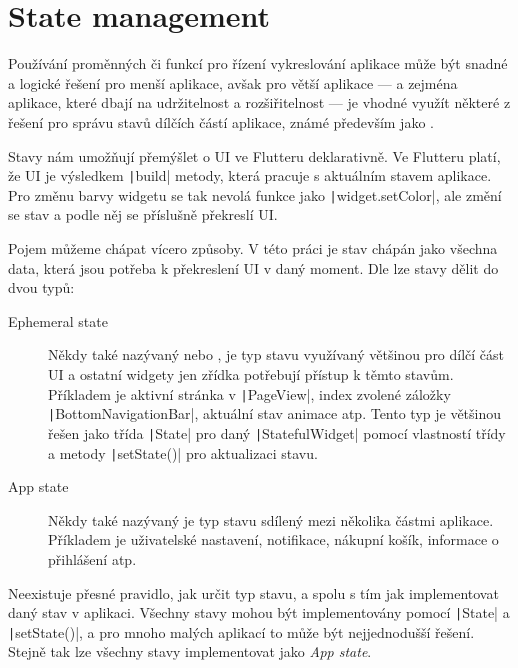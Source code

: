 \section{State management}

Používání proměnných či funkcí pro řízení vykreslování aplikace může být
snadné a logické řešení pro menší aplikace,
avšak pro větší aplikace
--- a zejména aplikace, které dbají na udržitelnost a rozšiřitelnost ---
je vhodné využít některé z řešení pro správu stavů dílčích částí aplikace,
známé především jako .
 
Stavy nám umožňují přemýšlet o UI ve Flutteru deklarativně.
Ve Flutteru platí,
že UI je výsledkem \texttt|build| metody,
která pracuje s aktuálním stavem aplikace.
Pro změnu barvy widgetu se tak nevolá funkce jako
\texttt|widget.setColor|,
ale změní se stav a podle něj se příslušně překreslí UI.
\cite{flutter_state_mgmt_declarative}

Pojem  můžeme chápat vícero způsoby.
V této práci je stav chápán jako všechna data,
která jsou potřeba k překreslení UI v daný moment.
Dle \cite{flutter_state_mgmt_ephemeral_vs_app} lze stavy dělit do dvou typů:

\begin{description}
    \item[Ephemeral state] Někdy také nazývaný  nebo
,
je typ stavu využívaný většinou pro dílčí část UI
a ostatní widgety jen zřídka potřebují přístup k těmto stavům.
Příkladem je aktivní stránka v \texttt|PageView|,
index zvolené záložky \texttt|BottomNavigationBar|,
aktuální stav animace atp.
Tento typ je většinou řešen jako třída \texttt|State| pro daný
\texttt|StatefulWidget| pomocí vlastností třídy a metody
\texttt|setState()| pro aktualizaci stavu.
    \item[App state] Někdy také nazývaný  je typ stavu
sdílený mezi několika částmi aplikace.
Příkladem je uživatelské nastavení, notifikace, nákupní košík,
informace o přihlášení atp.
\end{description}

Neexistuje přesné pravidlo,
jak určit typ stavu,
a spolu s tím jak implementovat daný stav v aplikaci.
Všechny stavy mohou být implementovány pomocí \texttt|State| a
\texttt|setState()|,
a pro mnoho malých aplikací to může být nejjednodušší řešení.
Stejně tak lze všechny stavy implementovat jako \emph{App state}.

